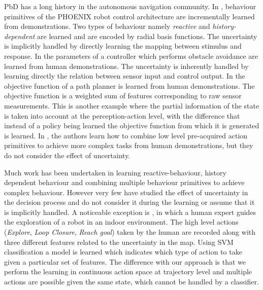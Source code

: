 PbD has a long history in the autonomous navigation community. In \cite{Kasper2001153}, behaviour primitives of 
the PHOENIX robot control architecture are incrementally 
learned from demonstrations. Two types of behaviour namely \textit{reactive} and \textit{history-dependent} are 
learned and are encoded by radial basis functions. The
uncertainty is implicitly handled by directly learning the mapping between stimulus and response. In \cite{Hamner_2006_5810} the parameters of a
controller which performs obstacle avoidance are learned from human demonstrations. The uncertainty is inherently handled by learning directly the relation between sensor 
input and control output. In \cite{LfD_Autonomous_Navigation_in_Complex_Unstructured_Terrain} the objective function of a path planner is learned from human demonstrations. 
The objective function is a weighted sum of features corresponding to raw sensor measurements. This is another example where the partial information of the state is 
taken into account at the perception-action level, with the difference that instead of a policy being learned the objective function from which it is generated is learned. 
In \cite{Nicolescu01learningand}, the authors learn how to combine low level pre-acquired action 
primitives to achieve more complex tasks from human demonstrations, but 
they do not consider the effect of uncertainty.

Much work has been undertaken in learning reactive-behaviour, history dependent behaviour and combining multiple behaviour primitives to achieve
complex behaviour. However very few have studied the effect of uncertainty in the decision process and 
do not consider it during the learning or assume that it is implicitly handled.
A noticeable exception is \cite{GeorgiosLidoris}, in which a human expert guides the exploration of a robot in an indoor environment. 
The high level actions (\textit{Explore}, \textit{Loop Closure}, \textit{Reach goal}) taken by the human are recorded along with three different features related to the uncertainty in the map. 
Using SVM classification a model is learned which indicates which type of action to take given a particular set of 
features. The difference with our approach is that we perform 
the learning in continuous action space at trajectory level and multiple actions are possible given the same state, which cannot be handled by a classifier.


